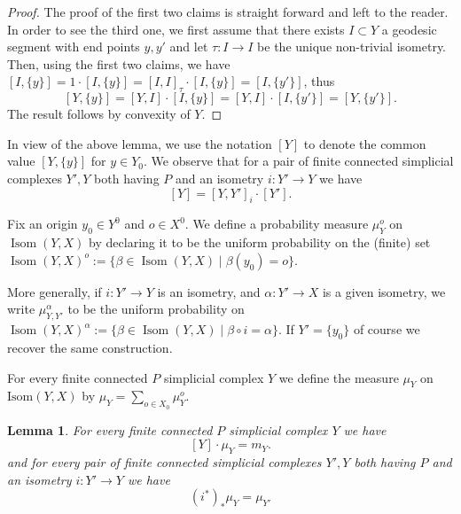 \documentclass[a4paper, 11pt]{article}
\theoremstyle{plain}
\newtheorem{lemma}[proposition]{Lemma}
\theoremstyle{definition}
\theoremstyle{remark}
\DeclareMathOperator{\Isom}{Isom}
\begin{document}
\begin{proof}
The proof of the first two claims is straight forward and left to the reader.
In order to see the third one, we first assume that there exists $I\subset Y$  a geodesic segment with end points $y,y'$
and let $\tau:I\to I$ be the unique non-trivial isometry.
Then, using the first two claims, we have $[I,\{y\}]=1\cdot [I,\{y\}]=[I,I]_\tau \cdot [I,\{y\}]=[I,\{y'\}]$, thus
\[ [Y,\{y\}]=[Y,I] \cdot [I,\{y\}]= [Y,I] \cdot [I,\{y'\}]=[Y,\{y'\}]. \]
The result follows by convexity of $Y$.
\end{proof}

In view of the above lemma, we use the notation $[Y]$ to denote the common value $[Y,\{y\}]$ for $y\in Y_0$.
We observe that for a pair of finite connected simplicial complexes $Y',Y$ both having $P$ and an isometry $i:Y' \to Y$
we have 
\begin{equation} \label{eq:X}
[Y]=[Y,Y']_i\cdot [Y'].
\end{equation}

Fix an origin $y_0\in Y^0$ and $o\in X^0$. We define a probability measure $\mu_Y^o$ on $\Isom(Y,X)$ by declaring it to be the uniform probability  on the (finite) set $\Isom(Y,X)^o:=\{\beta\in \Isom(Y,X)\mid \beta(y_0)=o\}$.

More generally, if $i:Y'\to Y$ is an isometry, and $\alpha:Y'\to X$ is a given isometry, we write $\mu_{Y,Y'}^\alpha$ to be the uniform probability on  $\Isom(Y,X)^\alpha:=\{\beta\in \Isom(Y,X)\mid \beta\circ i = \alpha \}$. If $Y'=\{y_0\}$ of course we recover the same construction.

For every finite connected $P$ simplicial complex $Y$ we define the measure $\mu_Y$ on $\text{Isom}(Y,X)$ by  $\mu_Y=\sum\limits_{o\in X_0} \mu_Y^o$.



\begin{lemma}
For every finite connected $P$ simplicial complex $Y$ we have
\begin{equation} \label{eq:mu}
[Y]\cdot \mu_Y=m_Y.
\end{equation}
and  for every pair of finite connected 
simplicial complexes $Y',Y$ both having $P$ and an isometry $i:Y' \to Y$
we have 
\begin{equation} \label{eq:i*mu}
(i^*)_*\mu_Y=\mu_{Y'}
\end{equation}

\end{lemma}
\end{document}
